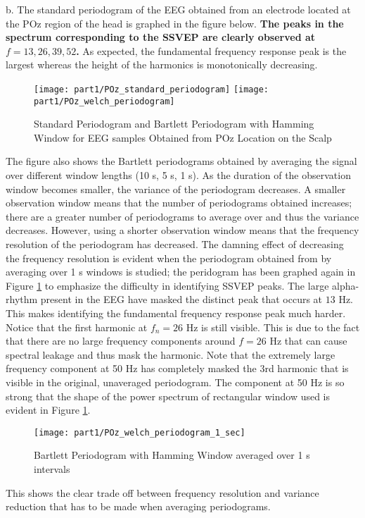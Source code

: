 \noindent{}b. The standard periodogram of the EEG obtained from an electrode located at the POz region of the head is graphed in the figure below. \textbf{The peaks in the spectrum corresponding to the SSVEP are clearly observed at $f=13,26,39,52$.} As expected, the fundamental frequency response peak is the largest whereas the height of the harmonics is monotonically decreasing.

\begin{figure}[H]
\centering{}
\texttt{[image: part1/POz\_standard\_periodogram]}
\texttt{[image: part1/POz\_welch\_periodogram]}
\caption{Standard Periodogram and Bartlett Periodogram with Hamming Window for EEG samples Obtained from POz Location on the Scalp}
\end{figure}

\noindent{}The figure also shows the Bartlett periodograms obtained by averaging the signal over different window lengths (10 s, 5 s, 1 s). As the duration of the observation window becomes smaller, the variance of the periodogram decreases. A smaller observation window means that the number of periodograms obtained increases; there are a greater number of periodograms to average over and thus the variance decreases. However, using a shorter observation window means that the frequency resolution of the periodogram has decreased. The damning effect of decreasing the frequency resolution is evident when the periodogram obtained from by averaging over 1 s windows is studied; the peridogram has been graphed again in Figure \ref{fig:bartlett_1_sec} to emphasize the difficulty in identifying SSVEP peaks. The large alpha-rhythm present in the EEG have masked the distinct peak that occurs at $13$ Hz. This makes identifying the fundamental frequency response peak much harder. Notice that the first harmonic at $f_n=26$ Hz is still visible. This is due to the fact that there are no large frequency components around $f=26$ Hz that can cause spectral leakage and thus mask the harmonic. Note that the extremely large frequency component at 50 Hz has completely masked the 3rd harmonic that is visible in the original, unaveraged periodogram. The component at 50 Hz is so strong that the shape of the power spectrum of rectangular window used is evident in Figure \ref{fig:bartlett_1_sec}.

\begin{figure}[H]
\centering{}
\texttt{[image: part1/POz\_welch\_periodogram\_1\_sec]}
\caption{Bartlett Periodogram with Hamming Window averaged over 1 s intervals}
\label{fig:bartlett_1_sec}
\end{figure}

\noindent{}This shows the clear trade off between frequency resolution and variance reduction that has to be made when averaging periodograms. 
